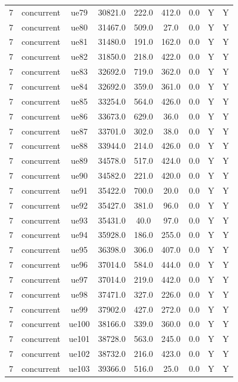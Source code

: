 \begin{table}[ht]
\begin{tabular}{|c|c|c|c|c|c|c|c|c|}
7 & concurrent & ue79 & 30821.0 & 222.0 & 412.0 & 0.0 & Y & Y \\
7 & concurrent & ue80 & 31467.0 & 509.0 & 27.0 & 0.0 & Y & Y \\
7 & concurrent & ue81 & 31480.0 & 191.0 & 162.0 & 0.0 & Y & Y \\
7 & concurrent & ue82 & 31850.0 & 218.0 & 422.0 & 0.0 & Y & Y \\
7 & concurrent & ue83 & 32692.0 & 719.0 & 362.0 & 0.0 & Y & Y \\
7 & concurrent & ue84 & 32692.0 & 359.0 & 361.0 & 0.0 & Y & Y \\
7 & concurrent & ue85 & 33254.0 & 564.0 & 426.0 & 0.0 & Y & Y \\
7 & concurrent & ue86 & 33673.0 & 629.0 & 36.0 & 0.0 & Y & Y \\
7 & concurrent & ue87 & 33701.0 & 302.0 & 38.0 & 0.0 & Y & Y \\
7 & concurrent & ue88 & 33944.0 & 214.0 & 426.0 & 0.0 & Y & Y \\
7 & concurrent & ue89 & 34578.0 & 517.0 & 424.0 & 0.0 & Y & Y \\
7 & concurrent & ue90 & 34582.0 & 221.0 & 420.0 & 0.0 & Y & Y \\
7 & concurrent & ue91 & 35422.0 & 700.0 & 20.0 & 0.0 & Y & Y \\
7 & concurrent & ue92 & 35427.0 & 381.0 & 96.0 & 0.0 & Y & Y \\
7 & concurrent & ue93 & 35431.0 & 40.0 & 97.0 & 0.0 & Y & Y \\
7 & concurrent & ue94 & 35928.0 & 186.0 & 255.0 & 0.0 & Y & Y \\
7 & concurrent & ue95 & 36398.0 & 306.0 & 407.0 & 0.0 & Y & Y \\
7 & concurrent & ue96 & 37014.0 & 584.0 & 444.0 & 0.0 & Y & Y \\
7 & concurrent & ue97 & 37014.0 & 219.0 & 442.0 & 0.0 & Y & Y \\
7 & concurrent & ue98 & 37471.0 & 327.0 & 226.0 & 0.0 & Y & Y \\
7 & concurrent & ue99 & 37902.0 & 427.0 & 272.0 & 0.0 & Y & Y \\
7 & concurrent & ue100 & 38166.0 & 339.0 & 360.0 & 0.0 & Y & Y \\
7 & concurrent & ue101 & 38728.0 & 563.0 & 245.0 & 0.0 & Y & Y \\
7 & concurrent & ue102 & 38732.0 & 216.0 & 423.0 & 0.0 & Y & Y \\
7 & concurrent & ue103 & 39366.0 & 516.0 & 25.0 & 0.0 & Y & Y \\

\end{tabular}
\end{table}
